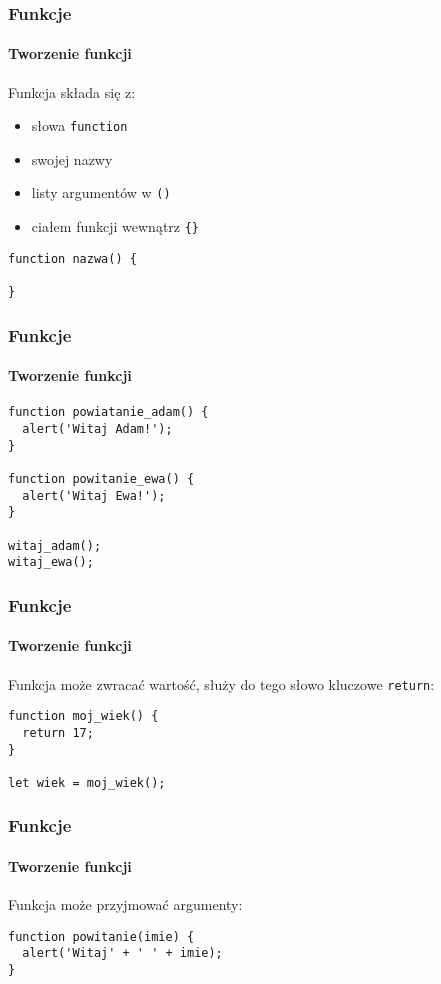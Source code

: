 \begin{frame}[fragile]
  \frametitle{Funkcje}
  \framesubtitle{Tworzenie funkcji}

  Funkcja składa się z:
  
  \begin{itemize}
    \item słowa \verb|function|
    \item swojej nazwy
    \item listy argumentów w \verb|()|
    \item ciałem funkcji wewnątrz \verb|{}|
  \end{itemize}

  \begin{verbatim}
function nazwa() {

}
  \end{verbatim}

\end{frame}


\begin{frame}[fragile]
  \frametitle{Funkcje}
  \framesubtitle{Tworzenie funkcji}

  \begin{verbatim}
function powiatanie_adam() {
  alert('Witaj Adam!');
}

function powitanie_ewa() {
  alert('Witaj Ewa!');
}

witaj_adam();
witaj_ewa();
  \end{verbatim}

\end{frame}


\begin{frame}[fragile]
  \frametitle{Funkcje}
  \framesubtitle{Tworzenie funkcji}

  Funkcja może zwracać wartość, służy do tego słowo kluczowe \verb|return|:

  \begin{verbatim}
function moj_wiek() {
  return 17;
}

let wiek = moj_wiek();
  \end{verbatim}

\end{frame}


\begin{frame}[fragile]
  \frametitle{Funkcje}
  \framesubtitle{Tworzenie funkcji}

  Funkcja może przyjmować argumenty:

  \begin{verbatim}
function powitanie(imie) {
  alert('Witaj' + ' ' + imie);
}
  \end{verbatim}

\end{frame}


